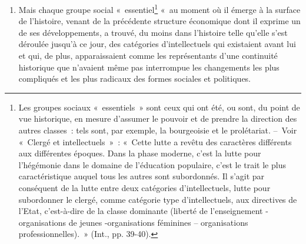 \documentclass[french,twoside]{book} %
\begin{document}
\begin{enumerate}[itemsep=\baselineskip,]
\item  Mais chaque groupe social « essentiel\footnote{Les groupes sociaux « essentiels » sont ceux qui ont été, ou sont, du point de vue historique, en mesure d’assumer le pouvoir et de prendre la direction des autres classes : tels sont, par exemple, la bourgeoisie et le prolétariat. – Voir « Clergé et intellectuels » : « Cette lutte a revêtu des caractères différents aux différentes époques. Dans la phase moderne, c’est la lutte pour l’hégémonie dans le domaine de l’éducation populaire, c’est le trait le plus caractéristique auquel tous les autres sont subordonnés. Il s’agit par conséquent de la lutte entre deux catégories d’intellectuels, lutte pour subordonner le clergé, comme catégorie type d’intellectuels, aux directives de l’Etat, c’est-à-dire de la classe dominante (liberté de l’enseignement - organisations de jeunes -organisations féminines – organisations professionnelles). » (Int., pp. 39-40).} « au moment où il émerge à la surface de l’histoire, venant de la précédente structure économique dont il exprime un de ses développements, a trouvé, du moins dans l’histoire telle qu’elle s’est déroulée jusqu’à ce jour, des catégories d’intellectuels qui existaient avant lui et qui, de plus, apparaissaient comme les représentants d’une continuité historique que n’avaient même pas interrompue les changements les plus compliqués et les plus radicaux des formes sociales et politiques.\par

\end{enumerate}
\end{document}
